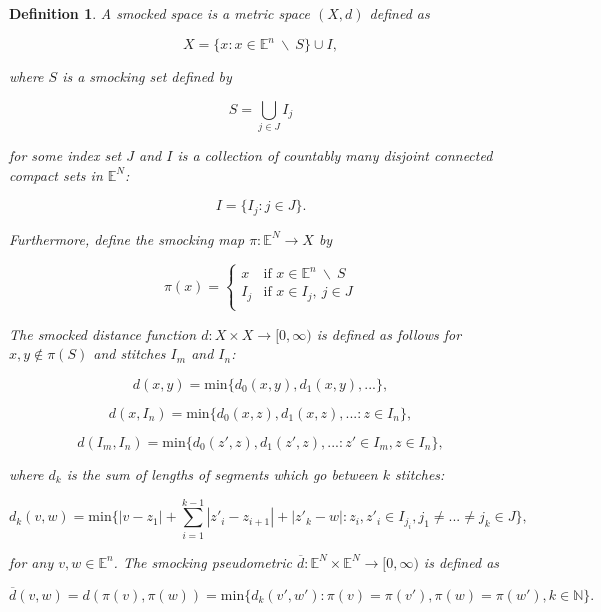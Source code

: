 \documentclass[12pt, letterpaper]{article}
\newtheorem{definition}{Definition}
\begin{document}
\begin{definition} A smocked space is a metric space $(X,d)$ defined as 

\[ X = \{ x: x \in \mathbb{E}^n \: \backslash \: S \} \cup I ,\]

\noindent
where $S$ is a smocking set defined by 

\[ S = \bigcup_{j \in J} I_j  \]

\noindent
for some index set $J$ and $I$ is a collection of countably many disjoint connected compact sets in $\mathbb{E}^N$:

\[I = \{ I_j : j \in J \} .\]

\noindent
Furthermore, define the smocking map $\pi: \mathbb{E}^N \rightarrow X$ by

\[ \pi(x) = \left\{
	\begin{array}{ll}
		x  & \mbox{if } x \in \mathbb{E}^n \: \backslash \: S \\
	 I_j  & \mbox{if } x \in I_j, \: j \in J\\
	\end{array}
\right. \]



\noindent 
The smocked distance function $d: X \times X \rightarrow [0, \infty)$ is defined as follows for $x,y \notin \pi(S)$ and stitches $I_m$ and $I_n$:

\[ d(x,y)   = \text{min} \{ d_0 (x,y), d_1 (x,y), ... \}  , \]

\[ d(x, I_n) = \text{min} \{ d_0 (x,z), d_1 (x,z), ... : z \in I_n \}     ,\]

\[ d( I_m, I_n) =  \text{min} \{ d_0 (z',z), d_1 (z',z), ... : z' \in I_m, z \in I_n \} ,\]



\noindent
where $d_k$ is the sum of lengths of segments which go between $k $ stitches: 

\[ d_k (v,w) = \text{min} \{ |v- z_1 | + \sum_{i=1}^{k-1} | z'_i - z_{i+1} | + |z'_k - w | : z_i, z'_i \in I_{j_i}, j_1 \neq ... \neq j_k \in J \}  ,\]

\noindent 
for any $v, w \in \mathbb{E}^n$.   The smocking pseudometric $\overline{d} : \mathbb{E}^N \times \mathbb{E}^N \rightarrow [ 0, \infty )$ is defined as 

\[  \overline{d} (v,w)  = d ( \pi (v), \pi (w)) = \text{min} \{ d_k (v', w') : \pi (v) = \pi (v'), \pi (w) = \pi (w'), k \in \mathbb{N}  \}  .\]
    
\end{definition}
 
\end{document}
